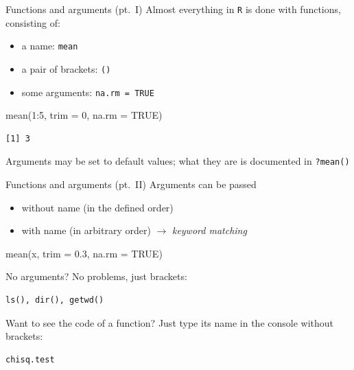 \documentclass[
  ignorenonframetext,
]{beamer}
\newenvironment{Shaded}{\begin{snugshade}}{\end{snugshade}}
\newcommand{\AttributeTok}[1]{\textcolor[rgb]{0.00,0.34,0.68}{#1}}
\newcommand{\ConstantTok}[1]{\textcolor[rgb]{0.67,0.33,0.00}{#1}}
\newcommand{\DecValTok}[1]{\textcolor[rgb]{0.69,0.50,0.00}{#1}}
\newcommand{\FloatTok}[1]{\textcolor[rgb]{0.69,0.50,0.00}{#1}}
\newcommand{\FunctionTok}[1]{\textcolor[rgb]{0.39,0.29,0.61}{#1}}
\newcommand{\NormalTok}[1]{\textcolor[rgb]{0.12,0.11,0.11}{#1}}
\newcommand{\SpecialCharTok}[1]{\textcolor[rgb]{0.24,0.68,0.91}{#1}}
\begin{document}
\begin{frame}[fragile]{Functions and arguments (pt.~I)}
\protect\hypertarget{functions-and-arguments-pt.-i}{}
Almost everything in \texttt{R} is done with functions, consisting of:

\begin{itemize}
\item
  a name: \texttt{mean}
\item
  a pair of brackets: \texttt{()}
\item
  some arguments: \texttt{na.rm\ =\ TRUE}
\end{itemize}

\begin{Shaded}
\begin{Highlighting}[]
\FunctionTok{mean}\NormalTok{(}\DecValTok{1}\SpecialCharTok{:}\DecValTok{5}\NormalTok{, }\AttributeTok{trim =} \DecValTok{0}\NormalTok{, }\AttributeTok{na.rm =} \ConstantTok{TRUE}\NormalTok{)}
\end{Highlighting}
\end{Shaded}

\begin{verbatim}
[1] 3
\end{verbatim}

Arguments may be set to default values; what they are is documented in
\texttt{?mean()}
\end{frame}

\begin{frame}[fragile]{Functions and arguments (pt.~II)}
\protect\hypertarget{functions-and-arguments-pt.-ii}{}
Arguments can be passed

\begin{itemize}
\item
  without name (in the defined order)
\item
  with name (in arbitrary order) \(\rightarrow\) \emph{keyword matching}
\end{itemize}

\begin{Shaded}
\begin{Highlighting}[]
\FunctionTok{mean}\NormalTok{(x, }\AttributeTok{trim =} \FloatTok{0.3}\NormalTok{, }\AttributeTok{na.rm =} \ConstantTok{TRUE}\NormalTok{)}
\end{Highlighting}
\end{Shaded}

No arguments? No problems, just brackets:

\begin{verbatim}
ls(), dir(), getwd()
\end{verbatim}

Want to see the code of a function? Just type its name in the console
without brackets:

\begin{verbatim}
chisq.test
\end{verbatim}
\end{frame}
\end{document}
